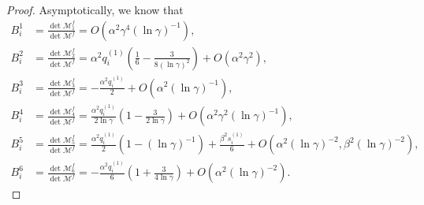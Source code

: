 \documentclass[11pt,letterpaper]{amsart}
\newcommand{\mM}{\mathcal{M}}
\theoremstyle{definition}
\theoremstyle{remark}
\numberwithin{equation}{section}
\begin{document}
\begin{proof}
Asymptotically, we know that
\begin{equation}
\begin{split}
B_i^1&=\frac{\det \mM^f_1}{\det \mM^f}=O(\alpha^2\gamma^4(\ln \gamma)^{-1}),\\
B_i^2&=\frac{\det \mM^f_2}{\det \mM^f}=\alpha^{2}q^{(1)}_i\left(\frac{1}{6}-\frac{3}{8(\ln \gamma)^2}\right)+O(\alpha^2 \gamma^{2}),\\
B_i^3&=\frac{\det \mM^f_3}{\det \mM^f}=-\frac{\alpha^{2}q^{(1)}_i}{2}+O(\alpha^2(\ln \gamma)^{-1}),\\
B_i^4&=\frac{\det \mM^f_4}{\det \mM^f}=\frac{\alpha^{2}q^{(1)}_i}{2\ln \gamma}\left(1-\frac{3}{2\ln \gamma}\right)+O(\alpha^2 \gamma^2 (\ln \gamma)^{-1}),\\
B_i^5&=\frac{\det \mM^f_5}{\det \mM^f}=\frac{\alpha^{2}q^{(1)}_i}{2}\left(1-(\ln \gamma)^{-1}\right)+\frac{\beta^2s^{(1)}_i}{6}+O(\alpha^2(\ln \gamma)^{-2},\beta^2(\ln \gamma)^{-2}),\\
B_i^6&=\frac{\det \mM^f_6}{\det \mM^f}=-\frac{\alpha^{2}q^{(1)}_i}{6}\left(1+\frac{3}{4\ln \gamma}\right)+O(\alpha^2(\ln \gamma)^{-2}).
\end{split}
\end{equation}

\end{proof}
\end{document}
